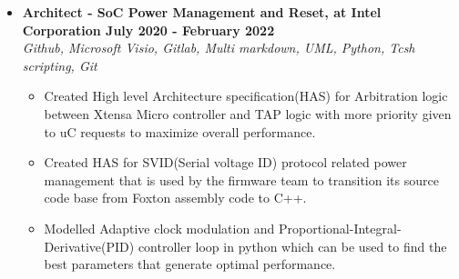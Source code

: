 \documentclass[a4paper,11pt]{article}
\newcommand{\isep}{-2 pt}
\newcommand{\spsep}{-0.75cm}
\begin{document}
\begin{itemize}
\begin{itemize}
			
		\end{itemize}

	\item \textbf{Architect - SoC Power Management and Reset, at Intel Corporation \hfill July 2020 - February 2022} \\
	\emph{Github, Microsoft Visio, Gitlab,  \hfill Multi markdown, UML, Python, Tcsh scripting, Git} \\[\spsep]
		\begin{itemize} \itemsep \isep
			\item Created High level Architecture specification(HAS) for Arbitration logic between Xtensa Micro controller and TAP logic with more priority given to uC requests to maximize overall performance.
			\item Created HAS for SVID(Serial voltage ID) protocol related power management that is used by the firmware team to transition its source code base from Foxton assembly code to C++.
			\item Modelled Adaptive clock modulation and Proportional-Integral-Derivative(PID) controller loop in python which can be used to find the best parameters that generate optimal performance.
		\end{itemize}
	

\end{itemize}
\end{document}
